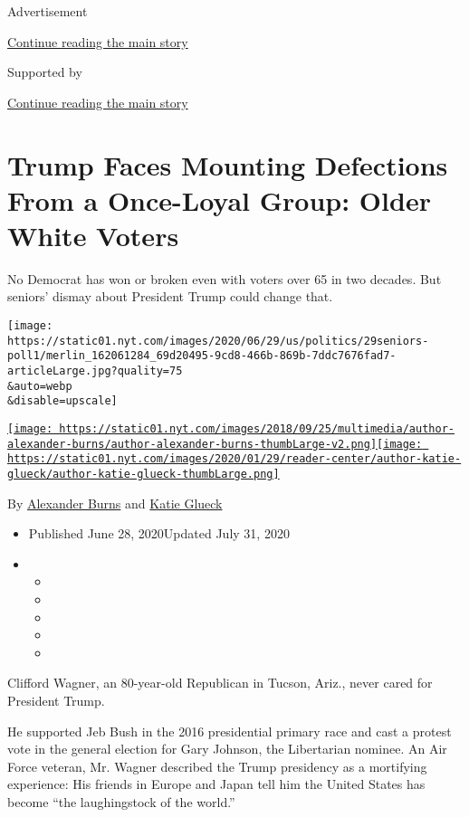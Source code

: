 Advertisement

\protect\hyperlink{after-top}{Continue reading the main story}

Supported by

\protect\hyperlink{after-sponsor}{Continue reading the main story}

\hypertarget{trump-faces-mounting-defections-from-a-once-loyal-group-older-white-voters}{%
\section{Trump Faces Mounting Defections From a Once-Loyal Group: Older
White
Voters}\label{trump-faces-mounting-defections-from-a-once-loyal-group-older-white-voters}}

No Democrat has won or broken even with voters over 65 in two decades.
But seniors' dismay about President Trump could change that.

\texttt{[image: https://static01.nyt.com/images/2020/06/29/us/politics/29seniors-poll1/merlin\_162061284\_69d20495-9cd8-466b-869b-7ddc7676fad7-articleLarge.jpg?quality=75\\\&auto=webp\\\&disable=upscale]}

\href{https://www.nytimes.com/by/alexander-burns}{\texttt{[image: https://static01.nyt.com/images/2018/09/25/multimedia/author-alexander-burns/author-alexander-burns-thumbLarge-v2.png]}}\href{https://www.nytimes.com/by/katie-glueck}{\texttt{[image: https://static01.nyt.com/images/2020/01/29/reader-center/author-katie-glueck/author-katie-glueck-thumbLarge.png]}}

By \href{https://www.nytimes.com/by/alexander-burns}{Alexander Burns}
and \href{https://www.nytimes.com/by/katie-glueck}{Katie Glueck}

\begin{itemize}
\item
  Published June 28, 2020Updated July 31, 2020
\item
  \begin{itemize}
  \item
  \item
  \item
  \item
  \item
  \end{itemize}
\end{itemize}

Clifford Wagner, an 80-year-old Republican in Tucson, Ariz., never cared
for President Trump.

He supported Jeb Bush in the 2016 presidential primary race and cast a
protest vote in the general election for Gary Johnson, the Libertarian
nominee. An Air Force veteran, Mr. Wagner described the Trump presidency
as a mortifying experience: His friends in Europe and Japan tell him the
United States has become ``the laughingstock of the world.''

